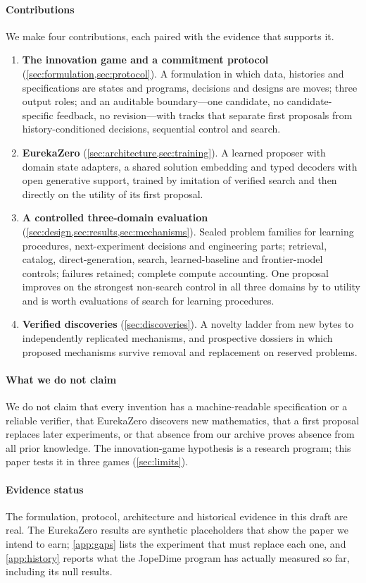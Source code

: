 \paragraph{Contributions} We make four contributions, each paired with the evidence that supports it.
\begin{enumerate}
\item \textbf{The innovation game and a commitment protocol} (\cref{sec:formulation,sec:protocol}).
A formulation in which data, histories and specifications are states and programs, decisions and
designs are moves; three output roles; and an auditable boundary---one candidate, no
candidate-specific feedback, no revision---with tracks that separate first proposals from
history-conditioned decisions, sequential control and search.
\item \textbf{EurekaZero} (\cref{sec:architecture,sec:training}). A learned proposer with domain
state adapters, a shared solution embedding and typed decoders with open generative support, trained
by imitation of verified search and then directly on the utility of its first proposal.
\item \textbf{A controlled three-domain evaluation} (\cref{sec:design,sec:results,sec:mechanisms}).
Sealed problem families for learning procedures, next-experiment decisions and engineering parts;
retrieval, catalog, direct-generation, search, learned-baseline and frontier-model controls;
failures retained; complete compute accounting. One proposal improves on the strongest non-search
control in all three domains by \syn[EZ-G01]{\EZdA} to \syn[EZ-G05]{\EZdC} utility and is worth
\syn[EZ-G02]{\EZbeqA} evaluations of search for learning procedures.
\item \textbf{Verified discoveries} (\cref{sec:discoveries}). A novelty ladder from new bytes to
independently replicated mechanisms, and prospective dossiers in which \syn[EZ-G15]{\EZnFive}
proposed mechanisms survive removal and replacement on reserved problems.
\end{enumerate}

\paragraph{What we do not claim} We do not claim that every invention has a machine-readable
specification or a reliable verifier, that EurekaZero discovers new mathematics, that a first
proposal replaces later experiments, or that absence from our archive proves absence from all prior
knowledge. The innovation-game hypothesis is a research program; this paper tests it in three games
(\cref{sec:limits}).

\paragraph{Evidence status} The formulation, protocol, architecture and historical evidence in this
draft are real. The EurekaZero results are synthetic placeholders that show the paper we intend to
earn; \cref{app:gaps} lists the experiment that must replace each one, and \cref{app:history}
reports what the JopeDime program has actually measured so far, including its null results.
